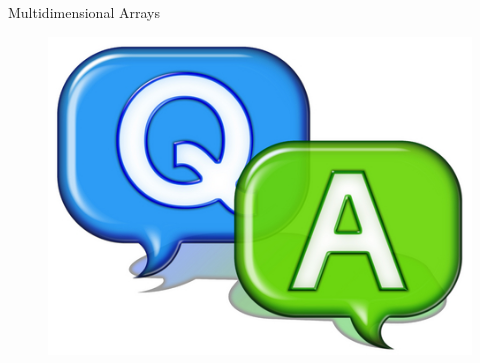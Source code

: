 \documentclass[14pt]{beamer}
\begin{document}
\begin{frame}{Multidimensional Arrays}
\begin{figure}[H]
 \begin{center}
   \includegraphics[scale=.3]{qa.png}   
 \end{center}
  \end{figure}
\end{frame}
\end{document}
